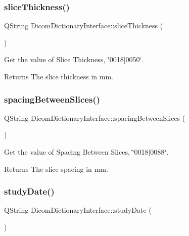 \subsubsection{\texorpdfstring{slice\+Thickness()}{sliceThickness()}}
{\footnotesize\ttfamily Q\+String Dicom\+Dictionary\+Interface\+::slice\+Thickness (\begin{DoxyParamCaption}{ }\end{DoxyParamCaption})}



Get the value of Slice Thickness, \char`\"{}0018$\vert$0050\char`\"{}. 

\begin{DoxyReturn}{Returns}
The slice thickness in mm. 
\end{DoxyReturn}
\mbox{\label{class_dicom_dictionary_interface_a08f8065f6b41b30e660fd1ff23e4fe0f}} 
\subsubsection{\texorpdfstring{spacing\+Between\+Slices()}{spacingBetweenSlices()}}
{\footnotesize\ttfamily Q\+String Dicom\+Dictionary\+Interface\+::spacing\+Between\+Slices (\begin{DoxyParamCaption}{ }\end{DoxyParamCaption})}



Get the value of Spacing Between Slices, \char`\"{}0018$\vert$0088\char`\"{}. 

\begin{DoxyReturn}{Returns}
The slice spacing in mm. 
\end{DoxyReturn}
\mbox{\label{class_dicom_dictionary_interface_ab52794617227e2b3722dbfea66a00306}} 
\subsubsection{\texorpdfstring{study\+Date()}{studyDate()}}
{\footnotesize\ttfamily Q\+String Dicom\+Dictionary\+Interface\+::study\+Date (\begin{DoxyParamCaption}{ }\end{DoxyParamCaption})}



